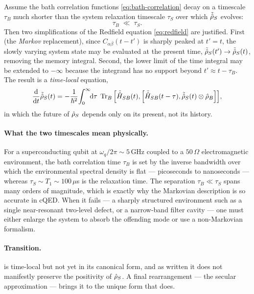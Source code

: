 \begin{statement}
\label{stmt:born-markov}
Assume the bath correlation functions \cref{eq:bath-correlation}
decay on a timescale $\tau_B$ much shorter than the system
relaxation timescale $\tau_S$ over which $\tilde{\hat{\rho}}_S$
evolves:
\begin{equation}
\label{eq:markov-condition}
\tau_B \;\ll\; \tau_S.
\end{equation}
Then two simplifications of the Redfield equation
\cref{eq:redfield} are justified. First (the \emph{Markov}
replacement), since $C_{\alpha\beta}(t-t')$ is sharply peaked at
$t'=t$, the slowly varying system state may be evaluated at the
present time, $\tilde{\hat{\rho}}_S(t')\to\tilde{\hat{\rho}}_S(t)$,
removing the memory integral. Second, the lower limit of the
time integral may be extended to $-\infty$ because the integrand
has no support beyond $t'\approx t-\tau_B$. The result is a
\emph{time-local} equation,
\begin{equation}
\label{eq:born-markov-eq}
\frac{\dd}{\dd t}\tilde{\op\rho}_S(t)
= -\frac{1}{\hbar^2}\!\int_0^{\infty}\!\!\dd\tau\;
\Tr_B\comm{\tilde{\op H}_{SB}(t)}{\comm{\tilde{\op H}_{SB}(t-\tau)}{\tilde{\op\rho}_S(t)\otimes\op\rho_B}},
\end{equation}
in which the future of $\hat{\rho}_S$ depends only on its present, not
its history.
\end{statement}

\paragraph{What the two timescales mean physically.}
For a superconducting qubit at $\omega_q/2\pi\sim 5\,$GHz coupled to
a $50\,\Omega$ electromagnetic environment, the bath correlation
time $\tau_B$ is set by the inverse bandwidth over which the
environmental spectral density is flat --- picoseconds to
nanoseconds --- whereas $\tau_S\sim T_1\sim 100\,\mu$s is the
relaxation time. The separation $\tau_B\ll\tau_S$ spans many
orders of magnitude, which is exactly why the Markovian description
is so accurate in cQED. When it fails --- a sharply structured
environment such as a single near-resonant two-level defect, or a
narrow-band filter cavity --- one must either enlarge the system to
absorb the offending mode or use a non-Markovian formalism.

\paragraph{Transition.}
 is time-local but not yet in its canonical
form, and as written it does not manifestly preserve the positivity
of $\hat{\rho}_S$. A final rearrangement --- the secular
approximation --- brings it to the unique form that does.

